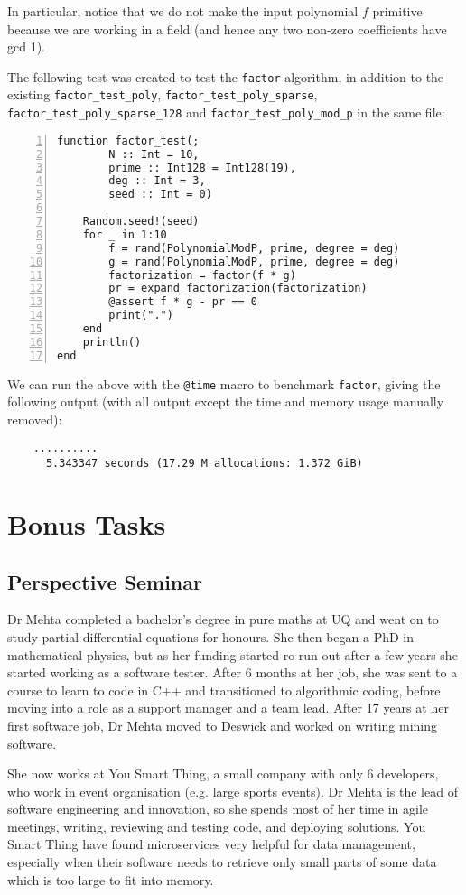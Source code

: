 \documentclass{article}
\theoremstyle{plain}
\numberwithin{theorem}{section}
\numberwithin{example}{section}
\theoremstyle{definition}
\numberwithin{definition}{section}
\begin{document}
In particular, notice that we do not make the input polynomial $f$ primitive
because we are working in a field (and hence any two non-zero coefficients have
gcd 1). \medbreak

The following test was created to test the \texttt{factor} algorithm, in
addition to the existing \texttt{factor\_test\_poly},
\texttt{factor\_test\_poly\_sparse}, \texttt{factor\_test\_poly\_sparse\_128}
and \texttt{factor\_test\_poly\_mod\_p} in the same file:

\begin{codebox}
    \begin{Verbatim}[numbers=left,xleftmargin=5mm]
function factor_test(;
        N :: Int = 10,
        prime :: Int128 = Int128(19),
        deg :: Int = 3,
        seed :: Int = 0)

    Random.seed!(seed)
    for _ in 1:10
        f = rand(PolynomialModP, prime, degree = deg)
        g = rand(PolynomialModP, prime, degree = deg)
        factorization = factor(f * g)
        pr = expand_factorization(factorization)
        @assert f * g - pr == 0
        print(".")
    end
    println()
end
    \end{Verbatim}
\end{codebox}

We can run the above with the \texttt{@time} macro to benchmark \texttt{factor},
giving the following output (with all output except the time and memory usage
manually removed):

\begin{Verbatim}
    ..........
      5.343347 seconds (17.29 M allocations: 1.372 GiB)
\end{Verbatim}
\bigbreak

\section{Bonus Tasks}
\subsection{Perspective Seminar}
Dr Mehta completed a bachelor's degree in pure maths at UQ and went on to study
partial differential equations for honours. She then began a PhD in mathematical
physics, but as her funding started ro run out after a few years she started
working as a software tester. After 6 months at her job, she was sent to a
course to learn to code in C++ and transitioned to algorithmic coding, before
moving into a role as a support manager and a team lead. After 17 years at her
first software job, Dr Mehta moved to Deswick and worked on writing mining
software. \medbreak

She now works at You Smart Thing, a small company with only 6 developers, who
work in event organisation (e.g. large sports events). Dr Mehta is the lead of
software engineering and innovation, so she spends most of her time in agile
meetings, writing, reviewing and testing code, and deploying solutions. You
Smart Thing have found microservices very helpful for data management,
especially when their software needs to retrieve only small parts of some data
which is too large to fit into memory.
\end{document}
